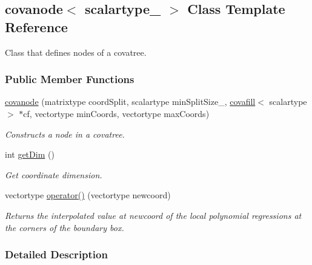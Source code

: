 \hypertarget{classcovanode}{}\subsection{covanode$<$ scalartype\+\_\+ $>$ Class Template Reference}
\label{classcovanode}


Class that defines nodes of a covatree.  


\subsubsection*{Public Member Functions}
\begin{DoxyCompactItemize}
\item 
\hyperlink{classcovanode_aeb9afb3b2447653b72a1fafdeb5eed00}{covanode} (matrixtype coord\+Split, scalartype min\+Split\+Size\+\_\+, \hyperlink{classcovafill}{covafill}$<$ scalartype $>$ $\ast$cf, vectortype min\+Coords, vectortype max\+Coords)
\begin{DoxyCompactList}\small\item\em Constructs a node in a covatree. \end{DoxyCompactList}\item 
\hypertarget{classcovanode_a9eec5ac7fa598d7d855e0433111d396a}{}int \hyperlink{classcovanode_a9eec5ac7fa598d7d855e0433111d396a}{get\+Dim} ()\label{classcovanode_a9eec5ac7fa598d7d855e0433111d396a}

\begin{DoxyCompactList}\small\item\em Get coordinate dimension. \end{DoxyCompactList}\item 
\hypertarget{classcovanode_a6e4ccc5051d2b52192a8cc70a0a401bb}{}vectortype \hyperlink{classcovanode_a6e4ccc5051d2b52192a8cc70a0a401bb}{operator()} (vectortype newcoord)\label{classcovanode_a6e4ccc5051d2b52192a8cc70a0a401bb}

\begin{DoxyCompactList}\small\item\em Returns the interpolated value at {\itshape newcoord} of the local polynomial regressions at the corners of the boundary box. \end{DoxyCompactList}\end{DoxyCompactItemize}


\subsubsection{Detailed Description}
